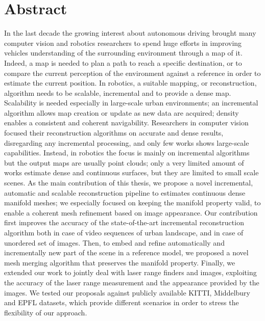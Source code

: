 \chapter*{Abstract}
In the last decade the growing interest about autonomous driving brought many computer vision and robotics researchers to spend  huge efforts in improving  vehicles understanding of the surrounding environment through a map of it.
Indeed, a map is needed to plan a path to reach a specific destination, or to compare the current perception of the environment against a reference in order to estimate the current position.
In robotics, a suitable mapping, or reconstruction, algorithm needs  to be scalable, incremental and to provide a dense map. 
Scalability is needed especially in large-scale urban environments; an incremental algorithm allows map creation or update as new data are acquired; density enables a consistent and coherent navigability.
Researchers in computer vision focused their reconstruction algorithms on accurate and dense results, disregarding any incremental processing, and only few works shows large-scale capabilities.  
Instead, in robotics the focus is mainly on incremental algorithms but the output maps are usually point clouds; only a very limited amount of works estimate dense and continuous surfaces, but they are limited to small scale scenes.
As the main contribution of this thesis, we propose a novel incremental, automatic and scalable reconstruction  pipeline to estimates continuous dense manifold meshes; we especially focused on keeping the manifold property valid, to enable a coherent mesh refinement based on image appearance.  
Our contribution first improves the accuracy of the state-of-the-art incremental reconstruction algorithm both in case of video sequences of urban landscape, and in case of unordered set of images.
Then, to embed and refine automatically and incrementally new part of the scene in a reference  model, we proposed a novel mesh merging algorithm that preserves the manifold property.
Finally, we extended our work to jointly deal with laser range finders and images, exploiting the accuracy of the laser range measurement and the appearance provided by the images.
We tested our proposals against publicly available KITTI, Middelbury and EPFL datasets, which provide different scenarios in order to stress the flexibility of our approach.


